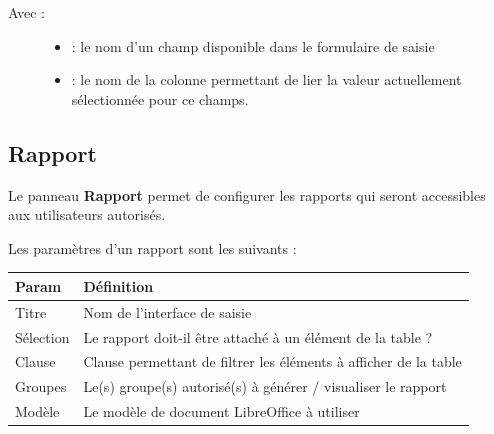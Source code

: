 \documentclass[letterpaper,10pt,english]{sphinxmanual}
\begin{document}
\code{{[}\{"XX":\{"tfield":"YY","init":"true","display": "always","operator":"=","options":{[}{]}\}\}{]}}
\begin{description}
\item[{Avec :}] \leavevmode\begin{itemize}
\item {} 
 : le nom d'un champ disponible dans le formulaire de saisie

\item {} 
 : le nom de la colonne permettant de lier la valeur
actuellement sélectionnée pour ce champs.

\end{itemize}

\end{description}


\subsection{Rapport}
\label{tables/infopanel:rapport}
Le panneau \textbf{Rapport} permet de configurer les rapports qui seront
accessibles aux utilisateurs autorisés.


Les paramètres d'un rapport sont les suivants :

\begin{tabulary}{\linewidth}{|L|L|}
\hline

\textbf{Param}
 & 
\textbf{Définition}
\\
\hline
Titre
 & 
Nom de l'interface de saisie
\\
\hline
Sélection
 & 
Le rapport doit-il être attaché à un élément de la table ?
\\
\hline
Clause
 & 
Clause permettant de filtrer les éléments à afficher de la table
\\
\hline
Groupes
 & 
Le(s) groupe(s) autorisé(s) à générer / visualiser le rapport
\\
\hline
Modèle
 & 
Le modèle de document LibreOffice à utiliser
\\
\hline\end{tabulary}
\end{document}
